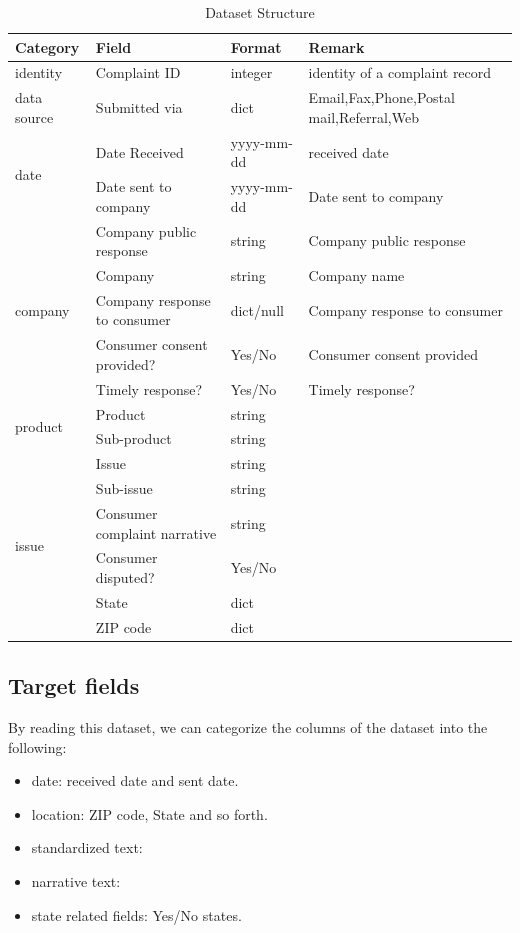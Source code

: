 \documentclass[conference]{IEEEtran}
\begin{document}
\begin{table}[h]
\caption{Dataset Structure}
\begin{tabular}{p{1cm}|p{1.5cm}|p{0.7cm}|p{3.5cm}}
\hline
\hline
Category & Field & Format & Remark \\ \hline
identity & Complaint ID & integer & identity of a complaint record  
\\ \hline
data source & Submitted via & dict & Email,Fax,Phone,Postal mail,Referral,Web  
\\ \hline
\multirow{2}{*}{date} & Date Received & yyyy-mm-dd & received date  
\\ \cline{2-4}
 & Date sent to company & yyyy-mm-dd & Date sent to company  
\\ \hline
\multirow{5}{*}{company} & Company public response & string & Company public response  \\ \cline{2-4}
 & Company  & string & Company name \\ \cline{2-4}
 & Company response to consumer  & dict/null & Company response to consumer \\ \cline{2-4}
 & Consumer consent provided?  & Yes/No & Consumer consent provided \\ \cline{2-4}
 & Timely response?  & Yes/No & Timely response? \\ \hline
\multirow{2}{*}{product} & Product  & string & \\ \cline{2-4}
 & Sub-product  & string & \\ \hline
\multirow{6}{*}{issue} & Issue  & string & \\ \cline{2-4}
 & Sub-issue  & string & \\ \cline{2-4}
 & Consumer complaint narrative  & string & \\ \cline{2-4}
 & Consumer disputed?  & Yes/No & \\ \cline{2-4}
 & State  & dict & \\ \cline{2-4}
 & ZIP code  & dict & \\ \hline
\hline
\end{tabular}
\end{table}

\subsection{Target fields}\label{AA}
By reading this dataset, we can categorize the columns of the dataset into the following:
\begin{itemize}
\item date: received date and sent date.
\item location: ZIP code, State and so forth.
\item standardized text:
\item narrative text: 
\item state related fields: Yes/No states.
\end{itemize}
\end{document}

